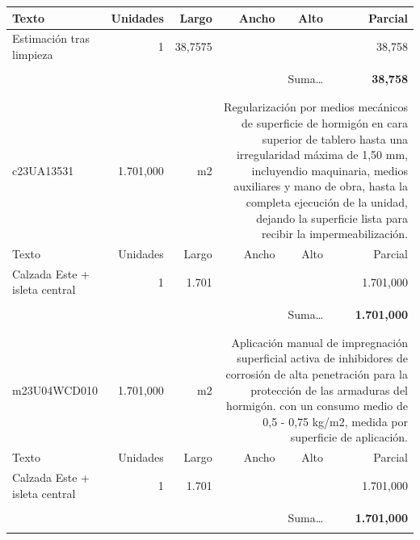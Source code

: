 \documentclass{book}%
\begin{document}
\begin{longtable}{lrrrrr}
Texto&Unidades&Largo&Ancho&Alto&Parcial\\%
\hline%
\multicolumn{1}{p{3.5cm}}{Estimación tras limpieza}&1&38,7575&&&    38,758\\%
&&&&&\\%
\multicolumn{5}{r}{Suma\ldots}&\textbf{    38,758}\\%
\hline%
&&&&&\\%
&&&&&\\%
c23UA13531& 1.701,000& m2&\multicolumn{3}{p{6cm}}{\scriptsize Regularización por medios mecánicos de superficie de hormigón en cara superior de tablero hasta una irregularidad máxima de 1,50 mm, incluyendio maquinaria, medios auxiliares y mano de obra, hasta la completa ejecución de la unidad, dejando la superficie lista para recibir la impermeabilización.\normalsize}\\%
Texto&Unidades&Largo&Ancho&Alto&Parcial\\%
\hline%
\multicolumn{1}{p{3.5cm}}{Calzada Este + isleta central}&1&1.701&&& 1.701,000\\%
&&&&&\\%
\multicolumn{5}{r}{Suma\ldots}&\textbf{ 1.701,000}\\%
\hline%
&&&&&\\%
&&&&&\\%
m23U04WCD010& 1.701,000& m2&\multicolumn{3}{p{6cm}}{\scriptsize Aplicación manual de impregnación superficial activa de inhibidores de corrosión de alta penetración para la protección de las armaduras del hormigón. con un consumo medio de 0,5 - 0,75 kg/m2, medida por superficie de aplicación.\normalsize}\\%
Texto&Unidades&Largo&Ancho&Alto&Parcial\\%
\hline%
\multicolumn{1}{p{3.5cm}}{Calzada Este + isleta central}&1&1.701&&& 1.701,000\\%
&&&&&\\%
\multicolumn{5}{r}{Suma\ldots}&\textbf{ 1.701,000}\\%
\hline%
&&&&&\\%
\end{longtable}%
\newpage

%
\end{document}
